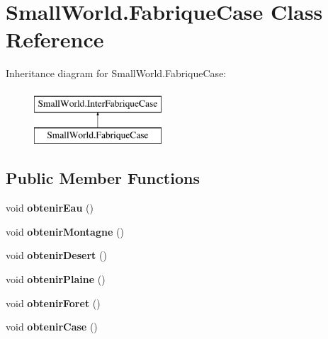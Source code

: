\hypertarget{class_small_world_1_1_fabrique_case}{\section{Small\-World.\-Fabrique\-Case Class Reference}
\label{class_small_world_1_1_fabrique_case}
}
Inheritance diagram for Small\-World.\-Fabrique\-Case\-:\begin{figure}[H]
\begin{center}
\leavevmode
\includegraphics[height=2.000000cm]{class_small_world_1_1_fabrique_case}
\end{center}
\end{figure}
\subsection*{Public Member Functions}
\begin{DoxyCompactItemize}
\item 
\hypertarget{class_small_world_1_1_fabrique_case_aa79573e726becd0bca9e014646c4f78b}{void {\bfseries obtenir\-Eau} ()}\label{class_small_world_1_1_fabrique_case_aa79573e726becd0bca9e014646c4f78b}

\item 
\hypertarget{class_small_world_1_1_fabrique_case_acc6cf14d1993e782a1ed89a7e1a27ea5}{void {\bfseries obtenir\-Montagne} ()}\label{class_small_world_1_1_fabrique_case_acc6cf14d1993e782a1ed89a7e1a27ea5}

\item 
\hypertarget{class_small_world_1_1_fabrique_case_a4f9585f6b5f56bdbed9ea60822456975}{void {\bfseries obtenir\-Desert} ()}\label{class_small_world_1_1_fabrique_case_a4f9585f6b5f56bdbed9ea60822456975}

\item 
\hypertarget{class_small_world_1_1_fabrique_case_a45ddb3587cb1eea8cedab4c7b6eb0c36}{void {\bfseries obtenir\-Plaine} ()}\label{class_small_world_1_1_fabrique_case_a45ddb3587cb1eea8cedab4c7b6eb0c36}

\item 
\hypertarget{class_small_world_1_1_fabrique_case_a8ab32b492139c98b86c4d9cd011cc70a}{void {\bfseries obtenir\-Foret} ()}\label{class_small_world_1_1_fabrique_case_a8ab32b492139c98b86c4d9cd011cc70a}

\item 
\hypertarget{class_small_world_1_1_fabrique_case_a4e8866effdb5680f02dc43b49e599d0c}{void {\bfseries obtenir\-Case} ()}\label{class_small_world_1_1_fabrique_case_a4e8866effdb5680f02dc43b49e599d0c}

\end{DoxyCompactItemize}
